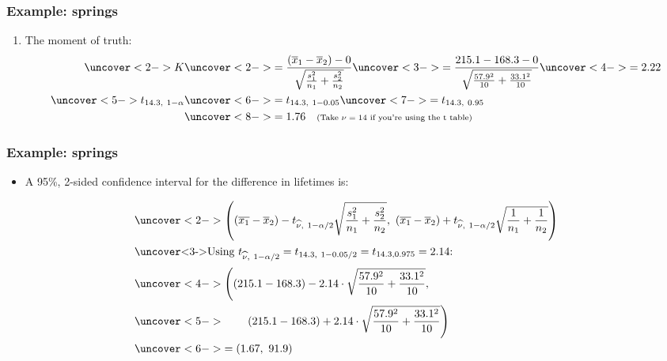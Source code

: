 \documentclass[handout]{beamer}\usepackage{graphicx, color}
\providecommand{\ov}[1]{\overline{#1}}
\providecommand{\wh}[1]{\widehat{#1}}
\numberwithin{equation}{section}
\begin{document}
\begin{frame}
\frametitle{Example: springs}
\begin{enumerate}[1. ]
 \setcounter{enumi}{\value{saveenum}}
\item The moment of truth:
\begin{align*}
\uncover<2->{K} & \uncover<2->{=  \frac{(\ov{x}_1 - \ov{x}_2) - 0}{ \sqrt{\frac{s_1^2}{n_1} + \frac{s_2^2}{n_2}}}} \uncover<3->{ = \frac{215.1 - 168.3 - 0}{ \sqrt{\frac{57.9^2}{10} + \frac{33.1^2}{10}}}} \uncover<4->{ = 2.22} \\
\uncover<5->{t_{14.3, \ 1 - \alpha}} & \uncover<6->{= t_{14.3, \ 1 - 0.05}} \uncover<7->{ = t_{14.3, \ 0.95}}  \\
&\uncover<8->{= 1.76 \quad \text{\scriptsize (Take $\nu = 14$ if you're using the t table)}}
\end{align*}
\end{enumerate}
\end{frame}


\begin{frame}
\frametitle{Example: springs} \scriptsize
\begin{itemize}
\item A 95\%, 2-sided confidence interval for the difference in lifetimes is:
\end{itemize}
\begin{align*}
&\uncover<2->{\left ((\ov{x_1} - \ov{x}_2) - t_{\wh{\nu}, \ 1 - \alpha/2} \sqrt{\frac{s_1^2}{n_1} + \frac{s_2^2}{n_2}} , \ (\ov{x_1} - \ov{x}_2) + t_{\wh{\nu}, \ 1 - \alpha/2} \sqrt{\frac{1}{n_1} + \frac{1}{n_2}} \right )} \\
\intertext{\uncover<3->{Using $t_{\wh{\nu}, \ 1 - \alpha/2} = t_{14.3, \ 1 - 0.05/2} = t_{14.3, 0.975} = 2.14$:}}
&\uncover<4->{\left ((215.1 - 168.3) - 2.14 \cdot  \sqrt{\frac{57.9^2}{10} + \frac{33.1^2}{10}} , \right .} \\ 
&\uncover<5->{ \qquad \left . (215.1 - 168.3) + 2.14 \cdot  \sqrt{\frac{57.9^2}{10} + \frac{33.1^2}{10}} \right )} \\
&\uncover<6->{=  (1.67, \ 91.9)}
\end{align*}
\begin{itemize}
\end{itemize}
\end{frame}
\end{document}

